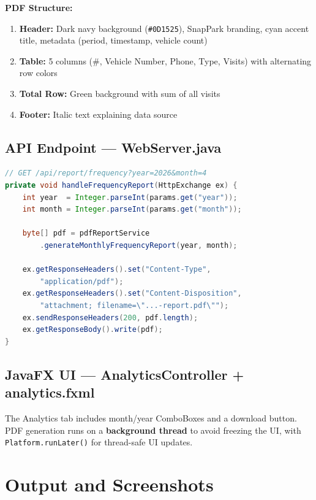\documentclass[12pt,a4paper]{article}
\begin{document}
\textbf{PDF Structure:}
\begin{enumerate}[noitemsep]
    \item \textbf{Header:} Dark navy background (\texttt{\#0D1525}), SnapPark branding, cyan accent title, metadata (period, timestamp, vehicle count)
    \item \textbf{Table:} 5 columns (\#, Vehicle Number, Phone, Type, Visits) with alternating row colors
    \item \textbf{Total Row:} Green background with sum of all visits
    \item \textbf{Footer:} Italic text explaining data source
\end{enumerate}

\subsection{API Endpoint — WebServer.java}

\begin{lstlisting}[language=Java, caption={REST API for PDF Download}]
// GET /api/report/frequency?year=2026&month=4
private void handleFrequencyReport(HttpExchange ex) {
    int year  = Integer.parseInt(params.get("year"));
    int month = Integer.parseInt(params.get("month"));
    
    byte[] pdf = pdfReportService
        .generateMonthlyFrequencyReport(year, month);
    
    ex.getResponseHeaders().set("Content-Type", 
        "application/pdf");
    ex.getResponseHeaders().set("Content-Disposition",
        "attachment; filename=\"...-report.pdf\"");
    ex.sendResponseHeaders(200, pdf.length);
    ex.getResponseBody().write(pdf);
}
\end{lstlisting}

\subsection{JavaFX UI — AnalyticsController + analytics.fxml}
The Analytics tab includes month/year ComboBoxes and a download button. PDF generation runs on a \textbf{background thread} to avoid freezing the UI, with \texttt{Platform.runLater()} for thread-safe UI updates.

\section{Output and Screenshots}
\end{document}
